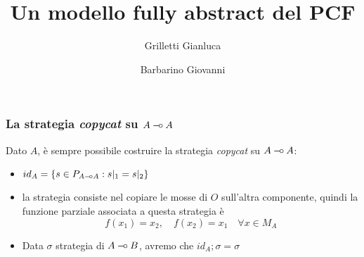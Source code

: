 \documentclass{beamer}
\title{Un modello fully abstract del PCF}
\author{Grilletti Gianluca \and Barbarino Giovanni}
\institute[Unipi]{Università di Pisa}
\newcommand{\limp}{\mathbin{{-}\mkern-3.5mu{\circ}}}
\begin{document}
\small




\begin{frame}
	\maketitle
	
\end{frame}


\begin{frame}

	\frametitle{La strategia \emph{copycat} su $A\limp A$}
Dato $A$, è sempre possibile costruire la strategia \emph{copycat} su $A\limp A$:

\begin{itemize}
 \item<2-> $id_A=\{s \in P_{A\limp A} : s|_1=s|_2 \}$ 
 \item<3-> la strategia consiste nel copiare le mosse di $O$ sull'altra componente, quindi la funzione parziale associata a questa strategia è
 \[
 f(x_1)=x_2, \quad f(x_2)=x_1 \quad \forall x \in M_A
 \]
 \item<4-> Data $\sigma$ strategia di $A\limp B$, avremo che $id_A;\sigma=\sigma$
\end{itemize}


\end{frame}
\end{document}
